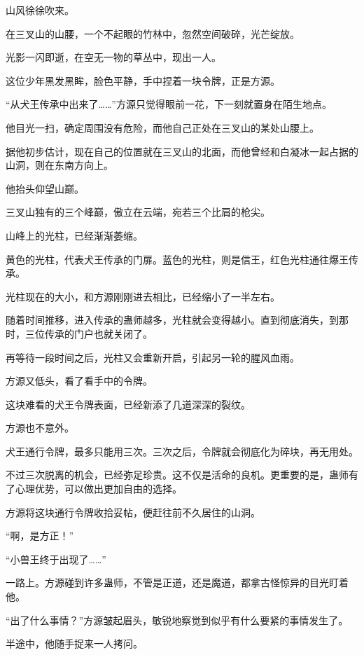 
\begin{this_body}

山风徐徐吹来。

在三叉山的山腰，一个不起眼的竹林中，忽然空间破碎，光芒绽放。

光影一闪即逝，在空无一物的草丛中，现出一人。

这位少年黑发黑眸，脸色平静，手中捏着一块令牌，正是方源。

“从犬王传承中出来了……”方源只觉得眼前一花，下一刻就置身在陌生地点。

他目光一扫，确定周围没有危险，而他自己正处在三叉山的某处山腰上。

据他初步估计，现在自己的位置就在三叉山的北面，而他曾经和白凝冰一起占据的山洞，则在东南方向上。

他抬头仰望山巅。

三叉山独有的三个峰巅，傲立在云端，宛若三个比肩的枪尖。

山峰上的光柱，已经渐渐萎缩。

黄色的光柱，代表犬王传承的门扉。蓝色的光柱，则是信王，红色光柱通往爆王传承。

光柱现在的大小，和方源刚刚进去相比，已经缩小了一半左右。

随着时间推移，进入传承的蛊师越多，光柱就会变得越小。直到彻底消失，到那时，三位传承的门户也就关闭了。

再等待一段时间之后，光柱又会重新开启，引起另一轮的腥风血雨。

方源又低头，看了看手中的令牌。

这块难看的犬王令牌表面，已经新添了几道深深的裂纹。

方源也不意外。

犬王通行令牌，最多只能用三次。三次之后，令牌就会彻底化为碎块，再无用处。

不过三次脱离的机会，已经弥足珍贵。这不仅是活命的良机。更重要的是，蛊师有了心理优势，可以做出更加自由的选择。

方源将这块通行令牌收拾妥帖，便赶往前不久居住的山洞。

“啊，是方正！”

“小兽王终于出现了……”

一路上。方源碰到许多蛊师，不管是正道，还是魔道，都拿古怪惊异的目光盯着他。

“出了什么事情？”方源皱起眉头，敏锐地察觉到似乎有什么要紧的事情发生了。

半途中，他随手捉来一人拷问。


\end{this_body}
